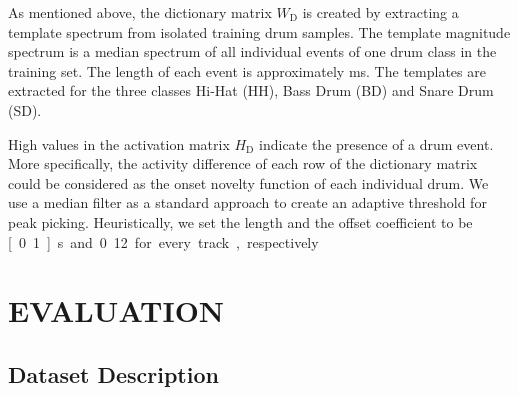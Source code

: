 \documentclass{article}
\begin{document}
As mentioned above, the dictionary matrix $W_\mathrm{D}$ is created by extracting a template spectrum from isolated training drum samples. The template magnitude spectrum is a median spectrum of all individual events of one drum class in the training set. The length of each event  is approximately \unit[80]{ms}. The templates are extracted for the three classes Hi-Hat (HH), Bass Drum (BD) and Snare Drum (SD).   

High values in the activation matrix $H_\mathrm{D}$ indicate the presence of a drum event. More specifically, the activity difference of each row of the dictionary matrix could be considered as the onset novelty function of each individual drum. We use a median filter as a standard approach to create an adaptive threshold for peak picking. Heuristically, we set the length and the offset coefficient to be \unit[0.1]{s} and 0.12 for every track, respectively. 
\vspace{-2mm}
\section{EVALUATION}\label{sec:Evaluation}
\subsection{Dataset Description}\label{subsec:data set description}
\end{document}
